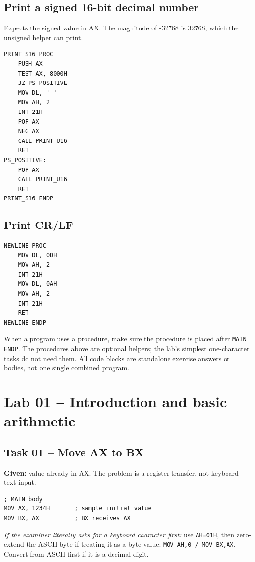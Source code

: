 \documentclass[10pt,a4paper]{article}
\begin{document}
\subsection{Print a signed 16-bit decimal number}
Expects the signed value in AX. The magnitude of -32768 is 32768, which the unsigned helper can print.
\begin{lstlisting}[style=asm]
PRINT_S16 PROC
    PUSH AX
    TEST AX, 8000H
    JZ PS_POSITIVE
    MOV DL, '-'
    MOV AH, 2
    INT 21H
    POP AX
    NEG AX
    CALL PRINT_U16
    RET
PS_POSITIVE:
    POP AX
    CALL PRINT_U16
    RET
PRINT_S16 ENDP
\end{lstlisting}

\subsection{Print CR/LF}
\begin{lstlisting}[style=asm]
NEWLINE PROC
    MOV DL, 0DH
    MOV AH, 2
    INT 21H
    MOV DL, 0AH
    MOV AH, 2
    INT 21H
    RET
NEWLINE ENDP
\end{lstlisting}

\begin{noteBox}
When a program uses a procedure, make sure the procedure is placed after \texttt{MAIN ENDP}. The procedures above are optional helpers; the lab's simplest one-character tasks do not need them. All code blocks are standalone exercise answers or bodies, not one single combined program.
\end{noteBox}

\section{Lab 01 -- Introduction and basic arithmetic}
\subsection*{Task 01 -- Move AX to BX}
\textbf{Given:} value already in AX. The problem is a register transfer, not keyboard text input.
\begin{lstlisting}[style=asm]
; MAIN body
MOV AX, 1234H       ; sample initial value
MOV BX, AX          ; BX receives AX
\end{lstlisting}
\textit{If the examiner literally asks for a keyboard character first:} use \texttt{AH=01H}, then zero-extend the ASCII byte if treating it as a byte value: \texttt{MOV AH,0 / MOV BX,AX}. Convert from ASCII first if it is a decimal digit.
\end{document}
